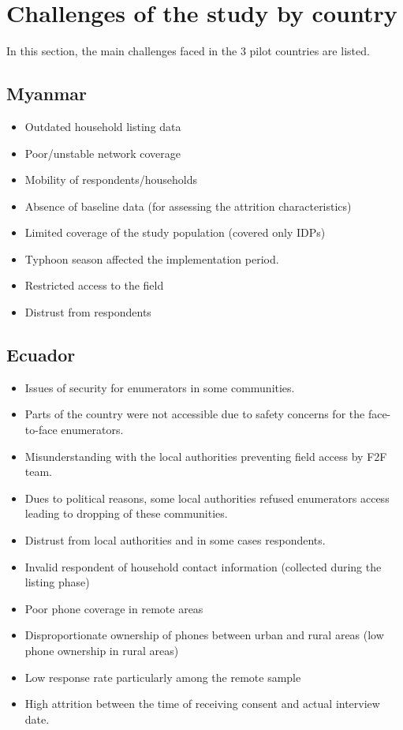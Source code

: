 \documentclass[11pt,harvard]{article}
\begin{document}
\section{Challenges of the study by country}

In this section, the main challenges faced in the 3 pilot countries are listed. 

\subsection{Myanmar}

\begin{itemize}[label=--, left=1.5em]
	\item[1.] Outdated household listing data
	\item[2.] Poor/unstable network coverage
	\item[3.] Mobility of respondents/households
	\item[4.] Absence of baseline data (for assessing the attrition characteristics) 
	\item[5.] Limited coverage of the study population (covered only IDPs)
	\item[6.] Typhoon season affected the implementation period.
	\item[7.] Restricted access to the field
	\item[8.] Distrust from respondents
\end{itemize}


\subsection{Ecuador}

\begin{itemize}[label=--, left=1.5em]
	\item[1.] Issues of security for enumerators in some communities.
		\item[a.]	Parts of the country were not accessible due to safety concerns for the face-to-face enumerators.
	\item[2.] Misunderstanding with the local authorities preventing field access by F2F team.
		\item[a.]	Dues to political reasons, some local authorities refused enumerators access leading to dropping of these communities.
		\item[b.]	Distrust from local authorities and in some cases respondents.
	\item[3.] Invalid respondent of household contact information (collected during the listing phase)
	\item[4.] Poor phone coverage in remote areas
	\item[5.] Disproportionate ownership of phones between urban and rural areas (low phone ownership in rural areas)
	\item[6.] Low response rate particularly among the remote sample
		\item[a.]	High attrition between the time of receiving consent and actual interview date.
\end{itemize}
\end{document}
